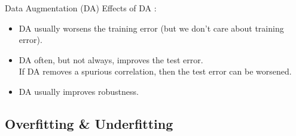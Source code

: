 \begin{frame}[allowframebreaks]
\begin{mydefinitionblock}{6.2}{Data Augmentation (DA)}
    Effects of DA :

    \begin{itemize}
        \item DA usually worsens the training error (but we don't care about training error).
        \item
        DA often, but not always, improves the test error.\\

        If DA removes a spurious correlation, then the test error can be worsened.
        \item DA usually improves robustness.
    \end{itemize}
\end{mydefinitionblock}

\end{frame}

\subsection{Overfitting \& Underfitting}

